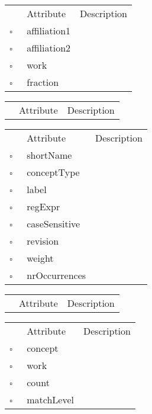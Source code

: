 \clearpage
\begin{table}
\caption{CollabWork  }

\begin{longtable}{llp{8cm}}
& Attribute & Description \\
$\square$\ & affiliation1 &  \\
$\square$\ & affiliation2 &  \\
$\square$\ & work &  \\
$\square$\ & fraction &  \\
\end{longtable}
\label{attr:CollabWork}
\end{table}

\begin{table}
\caption{Collection  }

\begin{longtable}{llp{8cm}}
& Attribute & Description \\
\end{longtable}
\label{attr:Collection}
\end{table}

\begin{table}
\caption{Concept  }

\begin{longtable}{llp{8cm}}
& Attribute & Description \\
$\square$\ & shortName &  \\
$\square$\ & conceptType &  \\
$\square$\ & label &  \\
$\square$\ & regExpr &  \\
$\square$\ & caseSensitive &  \\
$\square$\ & revision &  \\
$\square$\ & weight &  \\
$\square$\ & nrOccurrences &  \\
\end{longtable}
\label{attr:Concept}
\end{table}

\begin{table}
\caption{ConceptType  }

\begin{longtable}{llp{8cm}}
& Attribute & Description \\
\end{longtable}
\label{attr:ConceptType}
\end{table}

\begin{table}
\caption{ConceptWork  }

\begin{longtable}{llp{8cm}}
& Attribute & Description \\
$\square$\ & concept &  \\
$\square$\ & work &  \\
$\square$\ & count &  \\
$\square$\ & matchLevel &  \\
\end{longtable}
\label{attr:ConceptWork}
\end{table}

